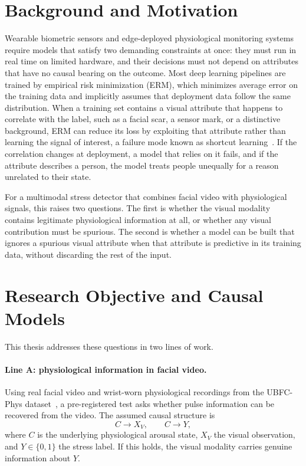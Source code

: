 \section{Background and Motivation}
Wearable biometric sensors and edge-deployed physiological monitoring systems require models that satisfy two demanding constraints at once: they must run in real time on limited hardware, and their decisions must not depend on attributes that have no causal bearing on the outcome. Most deep learning pipelines are trained by empirical risk minimization (ERM), which minimizes average error on the training data and implicitly assumes that deployment data follow the same distribution. When a training set contains a visual attribute that happens to correlate with the label, such as a facial scar, a sensor mark, or a distinctive background, ERM can reduce its loss by exploiting that attribute rather than learning the signal of interest, a failure mode known as shortcut learning~\cite{geirhos2020}. If the correlation changes at deployment, a model that relies on it fails, and if the attribute describes a person, the model treats people unequally for a reason unrelated to their state.

For a multimodal stress detector that combines facial video with physiological signals, this raises two questions. The first is whether the visual modality contains legitimate physiological information at all, or whether any visual contribution must be spurious. The second is whether a model can be built that ignores a spurious visual attribute when that attribute is predictive in its training data, without discarding the rest of the input.

\section{Research Objective and Causal Models}
This thesis addresses these questions in two lines of work.

\paragraph{Line A: physiological information in facial video.} Using real facial video and wrist-worn physiological recordings from the UBFC-Phys dataset~\cite{sabour2023}, a pre-registered test asks whether pulse information can be recovered from the video. The assumed causal structure is
\begin{equation}
C \to X_V, \qquad C \to Y,
\end{equation}
where $C$ is the underlying physiological arousal state, $X_V$ the visual observation, and $Y \in \{0,1\}$ the stress label. If this holds, the visual modality carries genuine information about $Y$.

